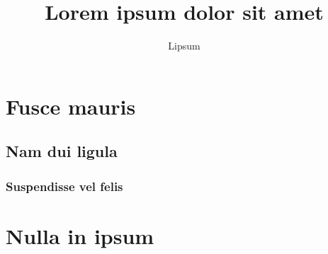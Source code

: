 \documentclass[titlepage]{scrartcl}
\author{Lipsum}
\title{Lorem ipsum dolor sit amet}
\begin{document}

\maketitle

\begin{abstract}
\lipsum[23]
\end{abstract}

\section{Fusce mauris}
\lipsum[6]
\lipsum[7]

\subsection{Nam dui ligula}
\lipsum[56]
\lipsum[57]
\lipsum[58]

\subsubsection{Suspendisse vel felis}
\lipsum[12]
\lipsum[13]

\section{Nulla in ipsum}
\lipsum[14]
\end{document}
